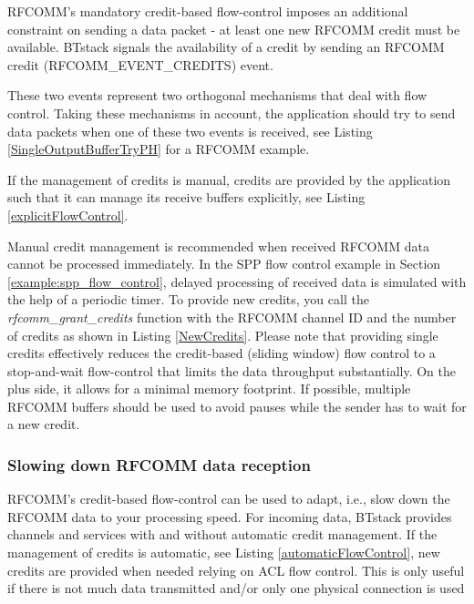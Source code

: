 RFCOMM's mandatory credit-based flow-control imposes an additional constraint on sending a data packet - at least one new RFCOMM credit must be available. BTstack signals the availability of a credit by sending an RFCOMM credit (RFCOMM\_EVENT\_CREDITS) event. 

These two events represent two orthogonal mechanisms that deal with flow control. Taking these mechanisms in account, the application should try to send data packets when one of these two events is received, see Listing \ref{SingleOutputBufferTryPH} for a RFCOMM example.


If the management of credits is manual, credits are provided by the application such that it can manage its receive buffers explicitly, see Listing \ref{explicitFlowControl}.

Manual credit management is recommended when received RFCOMM data cannot be processed immediately. In the SPP flow control example in Section \ref{example:spp_flow_control}, delayed processing of received data is simulated with the help of a periodic timer. To provide new credits, you call the \emph{rfcomm\_grant\_credits} function with the RFCOMM channel ID and the number of credits as shown in Listing \ref{NewCredits}.
Please note that providing single credits effectively reduces the credit-based (sliding window) flow control to a stop-and-wait flow-control that limits the data throughput substantially. On the plus side, it allows for a minimal memory footprint. If possible, multiple RFCOMM buffers should be used to avoid pauses while the sender has to wait for a new credit.


\subsubsection{Slowing down RFCOMM data reception}
\label{sec:manualCredits}
RFCOMM's credit-based flow-control can be used to adapt, i.e., slow down the RFCOMM data to your processing speed. 
For incoming data, BTstack provides channels and services with and without automatic credit management. 
If the management of credits is automatic, see Listing \ref{automaticFlowControl},  new credits are provided when needed relying on ACL flow control. This is only useful if there is not much data transmitted and/or only one physical connection is used


